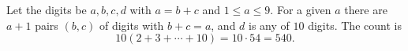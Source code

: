 Let the digits be $a,b,c,d$ with $a=b+c$ and $1\le a\le9$. For a given $a$ there are $a+1$ pairs $(b,c)$ of digits with $b+c=a$, and $d$ is any of $10$ digits. The count is
\[10\left(2+3+\cdots+10\right)=10\cdot54=\boxed{540}.\]
